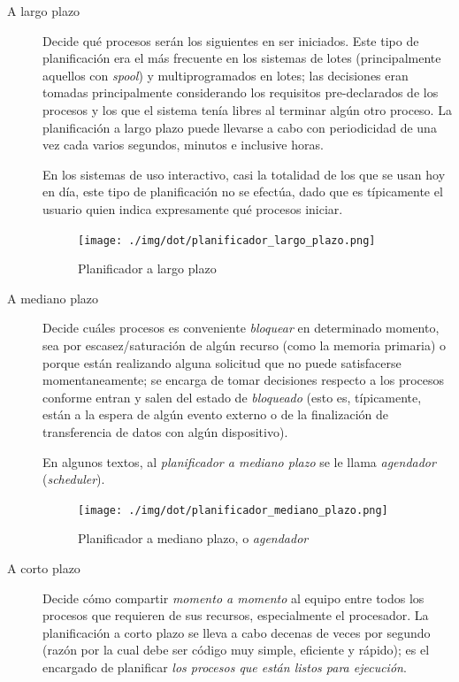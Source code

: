 \documentclass[11pt,fleqn]{book} %
\begin{document}
\begin{description}
\item[A largo plazo] Decide qué procesos serán los siguientes en ser
                   iniciados. Este tipo de planificación era el más
                   frecuente en los sistemas de lotes (principalmente
                   aquellos con \emph{spool}) y multiprogramados en lotes;
                   las decisiones eran tomadas principalmente
                   considerando los requisitos pre-declarados de los
                   procesos y los que el sistema tenía libres al
                   terminar algún otro proceso. La planificación a
                   largo plazo puede llevarse a cabo con periodicidad
                   de una vez cada varios segundos, minutos e
                   inclusive horas.

		   En los sistemas de uso interactivo, casi la
                   totalidad de los que se usan hoy en día, este tipo
                   de planificación no se efectúa, dado que es
                   típicamente el usuario quien indica expresamente
                   qué procesos iniciar.

		   \begin{figure}[htb]
		   \centering
		   \texttt{[image: ./img/dot/planificador\_largo\_plazo.png]}
		   \caption{\label{PLAN_planificador_largo_plazo}Planificador a largo plazo}
		   \end{figure}
\item[A mediano plazo] Decide cuáles procesos es conveniente \emph{bloquear}
     en determinado momento, sea por escasez/saturación de algún
     recurso (como la memoria primaria) o porque están realizando
     alguna solicitud que no puede satisfacerse momentaneamente; se
     encarga de tomar decisiones respecto a los procesos conforme
     entran y salen del estado de \emph{bloqueado} (esto es, típicamente,
     están a la espera de algún evento externo o de la finalización
     de transferencia de datos con algún dispositivo).

     En algunos textos, al \emph{planificador a mediano plazo} se le llama
     \emph{agendador} (\emph{scheduler}).

     \begin{figure}[htb]
     \centering
     \texttt{[image: ./img/dot/planificador\_mediano\_plazo.png]}
     \caption{\label{PLAN_planificador_mediano_plazo}Planificador a mediano plazo, o \emph{agendador}}
     \end{figure}
\item[A corto plazo] Decide cómo compartir \emph{momento a momento} al equipo
                   entre todos los procesos que requieren de sus
                   recursos, especialmente el procesador. La
                   planificación a corto plazo se lleva a cabo decenas
                   de veces por segundo (razón por la cual debe ser
                   código muy simple, eficiente y rápido); es el
                   encargado de planificar \emph{los procesos que están                    listos para ejecución}.


\end{description}
\end{document}
